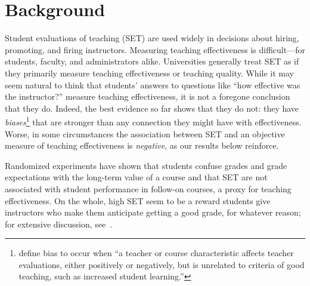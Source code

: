 \documentclass[12pt]{article}
\begin{document}
\begin{abstract}
%

\end{abstract}

\newpage

\section{Background}
Student evaluations of teaching (SET) are used widely 
in decisions about hiring, promoting, and firing instructors. 
Measuring teaching effectiveness is difficult---for students,
faculty, and administrators alike.
Universities generally treat SET as if they primarily
measure teaching effectiveness or teaching quality.
While it may seem natural to think that students' answers to questions like
``how effective was the instructor?'' measure teaching effectiveness,
it is not a foregone conclusion that they do.
Indeed, the best evidence so far shows that they do not:
they have \emph{biases}\footnote{%
  \citet[p.17]{Centra2000} define bias to occur when ``a teacher
   or course characteristic affects teacher evaluations, either positively or
negatively, but is unrelated to criteria of good teaching, such as increased student learning.'' 
}
that are stronger than any connection they might have with effectiveness.
Worse, in some circumstances the association between SET and an objective measure
of teaching effectiveness is
\emph{negative}, as our results below reinforce.

Randomized experiments \citep{Carrell2010a,Braga2014}
have shown that students confuse grades 
and grade expectations with the long-term value of a course and that SET are not associated with 
student performance in follow-on courses, a proxy for teaching effectiveness. 
On the whole, high SET seem to be a reward students give 
instructors who make them anticipate getting a good grade, for whatever reason;
for extensive discussion, see~\citet[Chapters 3--5]{johnson03}.
\end{document}
